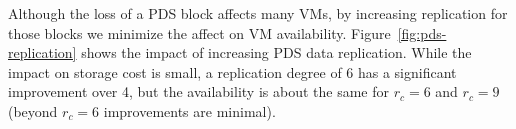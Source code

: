 Although the loss of a PDS block affects many VMs,
by increasing replication for those blocks we minimize the affect on VM availability.
%
Figure~\ref{fig:pds-replication} shows
the impact of increasing PDS data replication. 
While the impact on storage cost is small, 
a replication degree of 6  has a significant improvement over 4, but the availability is about
the same for $r_c=6$ and $r_c=9$ (beyond $r_c=6$ improvements are minimal).
 

